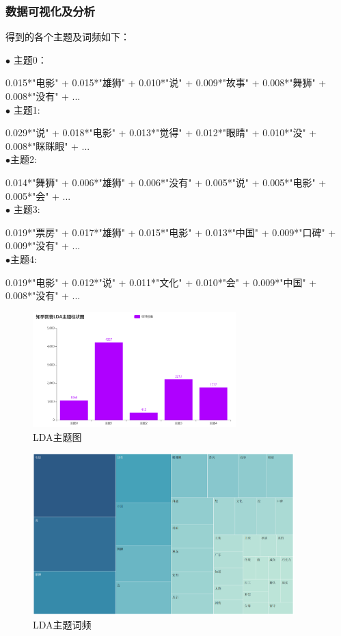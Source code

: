 \documentclass[12pt,a4paper,utf8]{article}
\begin{document}
\subsubsection{数据可视化及分析}
得到的各个主题及词频如下：

\small{ 
$\bullet$ 主题0：
 
0.015*"电影" + 0.015*"雄狮" + 0.010*"说" + 0.009*"故事" + 0.008*"舞狮" + 0.008*"没有" + ... \\

$\bullet$ 主题1: 

0.029*"说" + 0.018*"电影" + 0.013*"觉得" + 0.012*"眼睛" + 0.010*"没" + 0.008*"眯眯眼" + ...  \\

$\bullet$主题2:

0.014*"舞狮" + 0.006*"雄狮" + 0.006*"没有" + 0.005*"说" + 0.005*"电影" + 0.005*"会" + ... \\

$\bullet$ 主题3: 

0.019*"票房" + 0.017*"雄狮" + 0.015*"电影" + 0.013*"中国" + 0.009*"口碑" + 0.009*"没有" + ...  \\

$\bullet$主题4: 

0.019*"电影" + 0.012*"说" + 0.011*"文化" + 0.010*"会" + 0.009*"中国" + 0.008*"没有" + ...  \\
}
   
\begin{figure}[H]
    \centering
    \includegraphics[width=0.7\textwidth]{images/知乎LDA.png}  
    \caption{LDA主题图} 
\end{figure}   

\begin{figure}[H]
    \centering
    \includegraphics[width=0.9\textwidth]{images/LDA词频图.png}  
    \caption{LDA主题词频}
\end{figure} 
\end{document}
